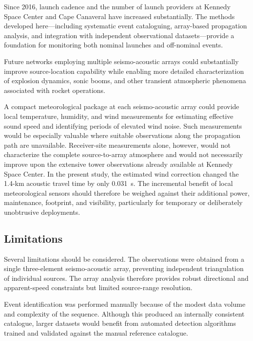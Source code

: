 \documentclass[]{seismica}
\begin{document}
Since 2016, launch cadence and the number of launch providers at Kennedy Space Center and Cape Canaveral have increased substantially. The methods developed here---including systematic event cataloguing, array-based propagation analysis, and integration with independent observational datasets---provide a foundation for monitoring both nominal launches and off-nominal events.

Future networks employing multiple seismo-acoustic arrays could substantially improve source-location capability while enabling more detailed characterization of explosion dynamics, sonic booms, and other transient atmospheric phenomena associated with rocket operations.

A compact meteorological package at each seismo-acoustic array could provide
local temperature, humidity, and wind measurements for estimating effective
sound speed and identifying periods of elevated wind noise. Such measurements
would be especially valuable where suitable observations along the propagation
path are unavailable. Receiver-site measurements alone, however, would not
characterize the complete source-to-array atmosphere and would not necessarily
improve upon the extensive tower observations already available at Kennedy
Space Center. In the present study, the estimated wind correction changed the
1.4-km acoustic travel time by only 0.031~s. The incremental benefit of local
meteorological sensors should therefore be weighed against their additional
power, maintenance, footprint, and visibility, particularly for temporary or
deliberately unobtrusive deployments.

\subsection{Limitations}
\label{sec:discussion_limitations}

Several limitations should be considered. The observations were obtained from a single three-element seismo-acoustic array, preventing independent triangulation of individual sources. The array analysis therefore provides robust directional and apparent-speed constraints but limited source-range resolution.

Event identification was performed manually because of the modest data volume and complexity of the sequence. Although this produced an internally consistent catalogue, larger datasets would benefit from automated detection algorithms trained and validated against the manual reference catalogue.
\end{document}
